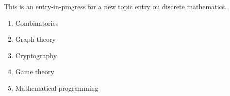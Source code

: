 \documentclass[12pt]{article}
\begin{document}
This is an entry-in-progress for a new topic entry on discrete mathematics.

\begin{enumerate}
\item Combinatorics
\item Graph theory
\item Cryptography
\item Game theory
\item Mathematical programming
\end{enumerate}
\end{document}
